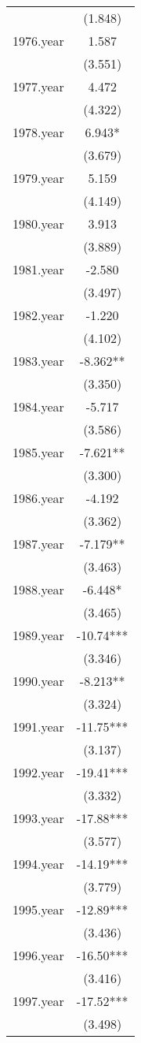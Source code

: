 \begin{tabular}{lc}
 & (1.848) \\
1976.year & 1.587 \\
 & (3.551) \\
1977.year & 4.472 \\
 & (4.322) \\
1978.year & 6.943* \\
 & (3.679) \\
1979.year & 5.159 \\
 & (4.149) \\
1980.year & 3.913 \\
 & (3.889) \\
1981.year & -2.580 \\
 & (3.497) \\
1982.year & -1.220 \\
 & (4.102) \\
1983.year & -8.362** \\
 & (3.350) \\
1984.year & -5.717 \\
 & (3.586) \\
1985.year & -7.621** \\
 & (3.300) \\
1986.year & -4.192 \\
 & (3.362) \\
1987.year & -7.179** \\
 & (3.463) \\
1988.year & -6.448* \\
 & (3.465) \\
1989.year & -10.74*** \\
 & (3.346) \\
1990.year & -8.213** \\
 & (3.324) \\
1991.year & -11.75*** \\
 & (3.137) \\
1992.year & -19.41*** \\
 & (3.332) \\
1993.year & -17.88*** \\
 & (3.577) \\
1994.year & -14.19*** \\
 & (3.779) \\
1995.year & -12.89*** \\
 & (3.436) \\
1996.year & -16.50*** \\
 & (3.416) \\
1997.year & -17.52*** \\
 & (3.498) \\

\end{tabular}
